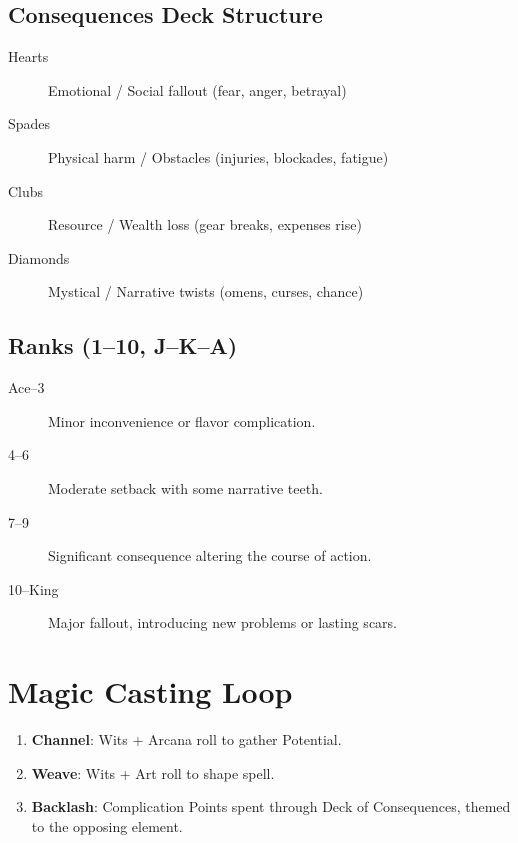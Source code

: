 \subsection{Consequences Deck Structure}

\begin{description}
\item[Hearts] Emotional / Social fallout (fear, anger, betrayal)
\item[Spades] Physical harm / Obstacles (injuries, blockades, fatigue)
\item[Clubs] Resource / Wealth loss (gear breaks, expenses rise)
\item[Diamonds] Mystical / Narrative twists (omens, curses, chance)
\end{description}

\subsection{Ranks (1--10, J--K--A)}

\begin{description}
\item[Ace--3] Minor inconvenience or flavor complication.
\item[4--6] Moderate setback with some narrative teeth.
\item[7--9] Significant consequence altering the course of action.
\item[10--King] Major fallout, introducing new problems or lasting scars.
\end{description}

\section{Magic Casting Loop}

\begin{enumerate}
\item \textbf{Channel}: Wits + Arcana roll to gather Potential.
\item \textbf{Weave}: Wits + Art roll to shape spell.
\item \textbf{Backlash}: Complication Points spent through Deck of Consequences, themed to the opposing element.
\end{enumerate}

